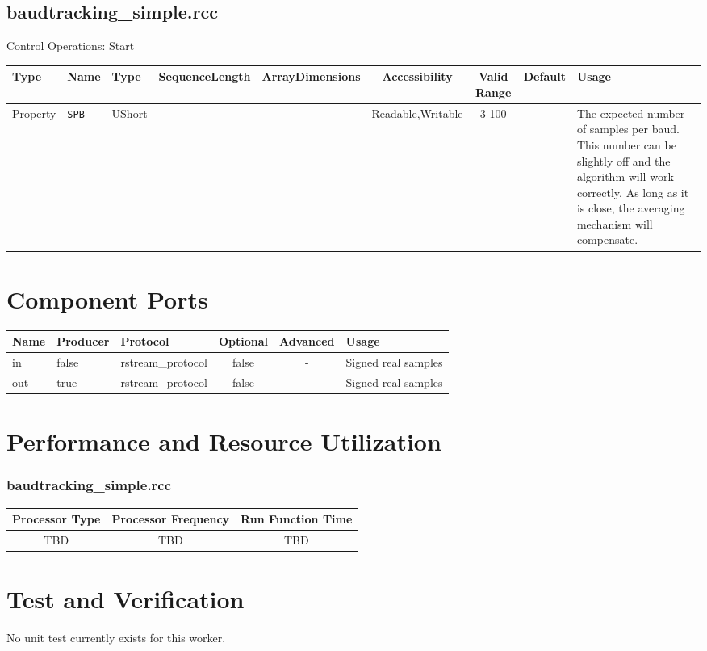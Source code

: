 \documentclass{article}
\def\comp{baudtracking\_simple}
\begin{document}
\begin{landscape}
	\subsection*{\comp.rcc}
	Control Operations: Start\newline\newline
	\begin{scriptsize}
		\begin{tabular}{|p{3cm}|p{2cm}|p{1cm}|c|c|c|c|c|p{5cm}|}
			\hline
			\rowcolor{blue}
			Type     & Name       & Type   & SequenceLength & ArrayDimensions & Accessibility     & Valid Range & Default & Usage                                                                                                                                                                             \\
			\hline
			Property & \verb+SPB+ & UShort & -              & -               & Readable,Writable & 3-100       & -       & The expected number of samples per baud.  This number can be slightly off and the algorithm will work correctly. As long as it is close, the averaging mechanism will compensate. \\
			\hline
		\end{tabular}
	\end{scriptsize}

	\section*{Component Ports}
	\begin{scriptsize}
		\begin{tabular}{|M{2cm}|M{1.5cm}|M{4cm}|c|c|M{9cm}|}
			\hline
			\rowcolor{blue}
			Name & Producer & Protocol          & Optional & Advanced & Usage               \\
			\hline
			in   & false    & rstream\_protocol & false    & -        & Signed real samples \\
			\hline
			out  & true     & rstream\_protocol & false    & -        & Signed real samples \\
			\hline
		\end{tabular}
	\end{scriptsize}
\end{landscape}

\section*{Performance and Resource Utilization}
\subsubsection*{\comp.rcc}
\begin{scriptsize}
	\begin{tabular}{|c|c|c|}
		\hline
		Processor Type & Processor Frequency & Run Function Time \\
		\hline
		TBD            & TBD                 & TBD               \\
		\hline
	\end{tabular}
\end{scriptsize}

\section*{Test and Verification}
\begin{flushleft}
	No unit test currently exists for this worker.
\end{flushleft}
\end{document}
